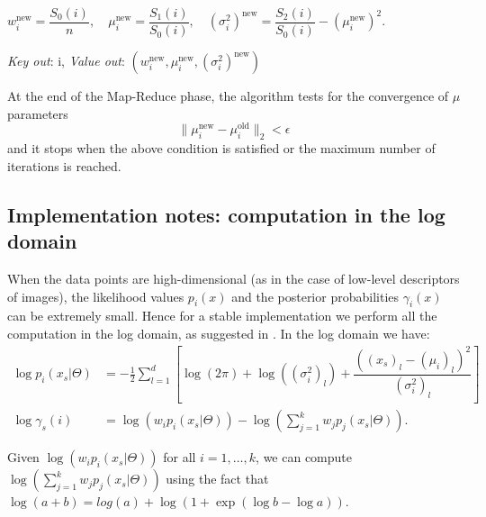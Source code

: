 \documentclass[a4paper,10pt]{article}
\begin{document}
\begin{description}
\begin{itemize}
		$
		w_i^{\text{new}}=\dfrac{S_0(i)}{n}, \quad 
		\mu_i^{\text{new}}=\dfrac{S_1(i)}{S_0(i)},\quad  
		(\sigma^2_i)^{\text{new}}=%
		\dfrac{S_2(i)}{S_0(i)}-(\mu_i^{\text{new}})^2.
		$
		
		
	\end{itemize}
	
	\textit{Key out}:  i, 	\textit{Value out}: $(w_i^{\text{new}},	\mu_i^{\text{new}},	(\sigma^2_i)^{\text{new}})$\\
\end{description}
At the end of the Map-Reduce phase, the algorithm tests for the convergence of $\mu$ parameters
$$\|\mu_i^{\text{new}}-\mu_i^{\text{old}}\|_2<\epsilon$$ 
and it stops when the above condition is satisfied or the maximum number of iterations is reached.


\subsection{Implementation notes: computation in the log domain}
When the data points are high-dimensional (as in the case of low-level descriptors of images), the likelihood values $p_i(x)$ and the posterior probabilities $\gamma_i(x)$ can be extremely small. Hence for a stable implementation we perform all the computation in the log domain, as suggested in \cite{sanchez13}. 
In the log domain we have:
\begin{align}
\log p_i(x_s|\Theta)&=-\frac{1}{2}\sum_{l=1}^d\left[\log(2\pi)+  \log((\sigma^2_{i})_l) +  \dfrac{\left((x_{s})_l-(\mu_{i})_l\right)^2}{(\sigma^2_{i})_l }\right]\\
\log \gamma_s(i)&=\log \left(w_i  p_i(x_s|\Theta) \right )- \log \left( \sum _{j=1}^k w_j  p_j(x_s|\Theta)\right).
\end{align}

Given $\log \left(w_i  p_i(x_s|\Theta) \right )$ for all $i=1,\dots, k$,  we can compute $\log \left( \sum _{j=1}^k w_j  p_j(x_s|\Theta)\right)$ using the fact that
$\log(a+b)= log(a)+ \log\left(1+\exp(\log b- \log a) \right).$\\
\end{document}
